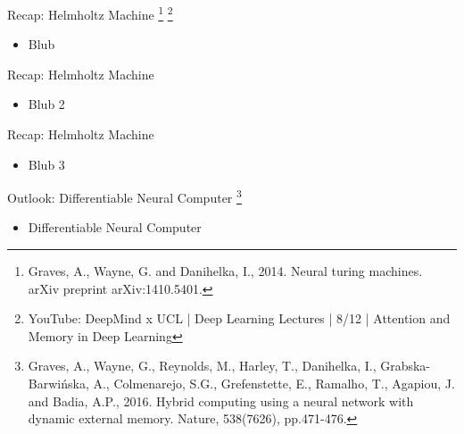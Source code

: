 \documentclass[AERbeamer%
              ,optEnglish%
              ,optBiber%
              ,optBibstyleAlphabetic%
              ,optBeamerClassicFormat%
              ]{AERlatex}%
\begin{document}
\begin{frame}[c]{Recap: Helmholtz Machine \footnote{Graves, A., Wayne, G. and Danihelka, I., 2014. Neural turing machines. arXiv preprint arXiv:1410.5401.}
                                          \footnote{YouTube: DeepMind x UCL | Deep Learning Lectures | 8/12 | Attention and Memory in Deep Learning}}
    \centering
    \begin{itemize}
        \item Blub
    \end{itemize}
\end{frame}


\begin{frame}[c]{Recap: Helmholtz Machine}
    \centering
    \begin{itemize}
        \item Blub 2
    \end{itemize}
\end{frame}


\begin{frame}[c]{Recap: Helmholtz Machine}
    \centering
    \begin{itemize}
        \item Blub 3
    \end{itemize}
\end{frame}


\begin{frame}[c]{Outlook: Differentiable Neural Computer \footnote{Graves, A., Wayne, G., Reynolds, M., Harley, T., Danihelka, I., Grabska-Barwińska, A., Colmenarejo,
                                                                   S.G., Grefenstette, E., Ramalho, T., Agapiou, J. and Badia, A.P., 2016. Hybrid computing using a
                                                                   neural network with dynamic external memory. Nature, 538(7626), pp.471-476.}}
    \centering
    \begin{itemize}
        \item Differentiable Neural Computer
    \end{itemize}
\end{frame}
\end{document}
